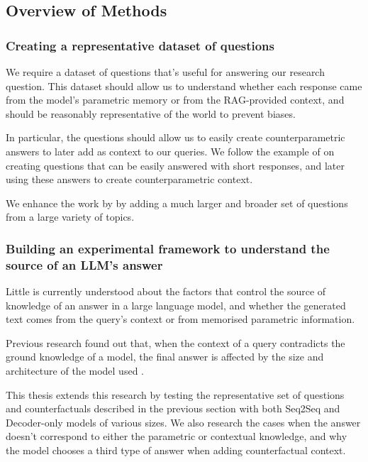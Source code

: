 \subsection{Overview of Methods}

\subsubsection{Creating a representative dataset of questions}
\label{questions_objective}

We require a dataset of questions that's useful for answering our research question.
This dataset should allow us to understand whether each response came from the model's parametric memory or from the RAG-provided context, and should be reasonably representative of the world to prevent biases.

In particular, the questions should allow us to easily create counterparametric answers to later add as context to our queries.
We follow the example of \citeauthor{factual_recall} on creating questions that can be easily answered with short responses, and later using these answers to create counterparametric context.

We enhance the work by \citeauthor{factual_recall} by adding a much larger and broader set of questions from a large variety of topics.

\subsubsection{Building an experimental framework to understand the source of an LLM's answer}
\label{intro_models_numbers}

Little is currently understood about the factors that control the source of knowledge of an answer in a large language model, and whether the generated text comes from the query's context or from memorised parametric information.

Previous research found out that, when the context of a query contradicts the ground knowledge of a model, the final answer is affected by the size and architecture of the model used \citep{factual_recall}.

This thesis extends this research by testing the representative set of questions and counterfactuals described in the previous section with both Seq2Seq and Decoder-only models of various sizes.
We also research the cases when the answer doesn't correspond to either the parametric or contextual knowledge, and why the model chooses a third type of answer when adding counterfactual context.

